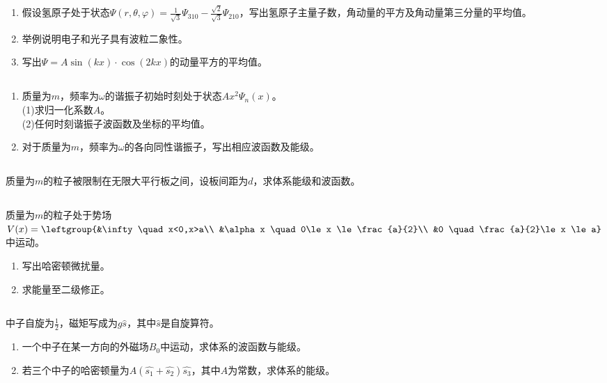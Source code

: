 
\subsection{ }
\begin{enumerate}
\item 假设氢原子处于状态$\Psi (r,\theta,\varphi)=\frac{1}{\sqrt{3}}\Psi_{310}-\frac{\sqrt{2}}{\sqrt{3}}\Psi_{210}$，写出氢原子主量子数，角动量的平方及角动量第三分量的平均值。
\item 举例说明电子和光子具有波粒二象性。
\item 写出$\Psi = A \sin(kx)\cdot\cos(2kx)$的动量平方的平均值。
\end{enumerate}
\subsection{ }
\begin{enumerate}
\item 质量为$m$，频率为$\omega$的谐振子初始时刻处于状态$Ax^2\Psi_n(x)$。\\
(1)求归一化系数$A$。\\
(2)任何时刻谐振子波函数及坐标的平均值。
\item 对于质量为$m$，频率为$\omega$的各向同性谐振子，写出相应波函数及能级。
\end{enumerate}
\subsection{ }
质量为$m$的粒子被限制在无限大平行板之间，设板间距为$d$，求体系能级和波函数。
\subsection{ }
质量为$m$的粒子处于势场$V(x)=\leftgroup{&\infty \quad x<0,x>a\\ &\alpha x \quad 0\le x \le \frac{a}{2}\\ &0 \quad \frac{a}{2}\le x \le a} $中运动。
\begin{enumerate}
\item 写出哈密顿微扰量。
\item 求能量至二级修正。
\end{enumerate}
\subsection{ }
中子自旋为$\frac{1}{2}$，磁矩写成为$g\hat{s}$，其中$\hat{s}$是自旋算符。
\begin{enumerate}
\item 一个中子在某一方向的外磁场$B_0$中运动，求体系的波函数与能级。
\item 若三个中子的哈密顿量为$A(\hat{s_1}+\hat{s_2})\hat{s_3} $，其中$A$为常数，求体系的能级。
\end{enumerate}